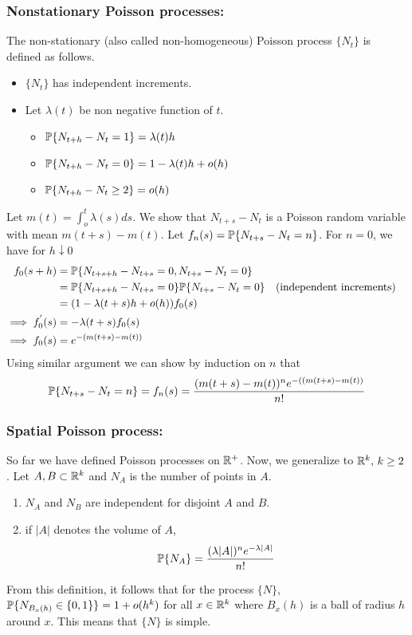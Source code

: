 \documentclass[all-lectures.tex]{subfiles}
\begin{document}
\subsubsection*{Nonstationary Poisson processes:}
The non-stationary (also called non-homogeneous) Poisson process $\{N_t\}$ is defined as follows. 
\begin{itemize}
\item $\{N_t\}$ has independent increments.
\item Let $\lambda(t)$ be non negative function of $t$. 
\begin{itemize}
\item $\P\{N_{t+h} - N_{t}  = 1 \}= \lambda(t) h$
\item $\P\{N_{t+h} - N_{t}  = 0 \}= 1 - \lambda(t) h + o(h)$
\item $\P\{N_{t+h} - N_{t}  \geq 2 \}= o(h)$
\end{itemize}
\end{itemize}
Let $m(t) = \int_o^t \lambda(s) ds$. We show that $N_{t+s} - N_{t}$ is a Poisson random variable with mean $m(t+s) - m(t)$. Let $f_n(s) = \P\{N_{t+s} - N_t = n\}$. For $n=0$, we have for $h \downarrow 0$
\begin{align*}
f_0(s+h) &= \P\{N_{t+s+h} - N_{t+s} = 0, N_{t+s} - N_{t} = 0\} \\
&= \P\{N_{t+s+h} - N_{t+s} = 0\} \P\{N_{t+s} - N_{t} = 0\} && \text{(independent increments)}\\
&= (1-\lambda(t+s) h+ o(h)) f_0(s) \\ 
\implies f_0^{'}(s) &= -\lambda(t+s) f_0(s) \\
\implies f_0(s) &= e^{- (m(t+s)-m(t))} \\
\end{align*}
Using similar argument we can show by induction on $n$ that 
\begin{align*}
\P\{N_{t+s} - N_t = n\} = f_n(s) = \frac{ (m(t+s) - m(t))^n e^{- ((m(t+s) - m(t))}}{n!}
\end{align*} 
\subsubsection*{Spatial Poisson process:}
So far we have defined Poisson processes on $\R^+$. Now, we generalize to $\R^{k},\, k \geq 2$.
Let $A,B \subset \R^k$ and $N_A$ is the number of points in $A$. 
\begin{enumerate}
\item $N_A$ and $N_B$ are independent for disjoint $A$ and $B$.
\item if $|A|$ denotes the volume of $A$, \begin{align*}
\P\{N_A\} = \frac{(\lambda|A|)^n e^{-\lambda |A|}}{n!}
\end{align*}
\end{enumerate}
From this definition, it follows that for the process $\{N\}$, $\P\{N_{B_x(h)} \in \{0,1\}\} = 1 + o(h^k)$ for all $x \in \R^k$ where $B_x(h)$ is a ball of radius $h$ around $x$. This means that $\{N\}$ is simple.
\end{document}
